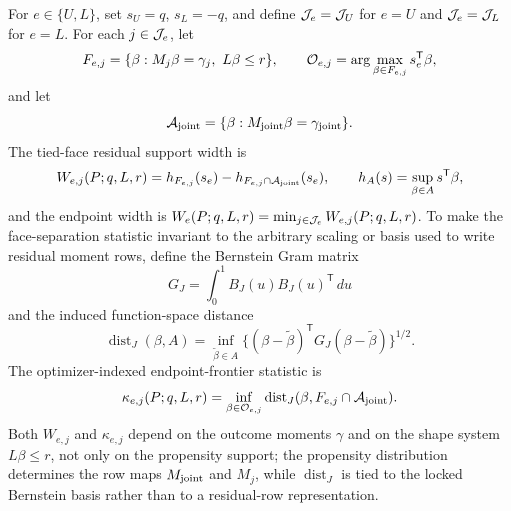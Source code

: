 \documentclass[11pt]{article}
\newcommand{\transpose}{\mathsf{T}}
\theoremstyle{definition}
\theoremstyle{plain}
\theoremstyle{remark}
\begin{document}
For \(e\in\{U,L\}\), set \(s_U=q\), \(s_L=-q\), and define
\({\cal J}_e={\cal J}_U\) for \(e=U\) and \({\cal J}_e={\cal J}_L\) for
\(e=L\).  For each \(j\in{\cal J}_e\), let
\[
F_{e,j}=\{\beta:M_j\beta=\gamma_j,\ L\beta\le r\},\qquad
{\cal O}_{e,j}=\arg\max_{\beta\in F_{e,j}}s_e^\transpose\beta ,
\]
and let
\[
{\cal A}_{\rm joint}=\{\beta:M_{\rm joint}\beta=\gamma_{\rm joint}\}.
\]
The tied-face residual support width is
\[
W_{e,j}(P;q,L,r)=
h_{F_{e,j}}(s_e)-h_{F_{e,j}\cap{\cal A}_{\rm joint}}(s_e),
\qquad
h_A(s)=\sup_{\beta\in A}s^\transpose\beta ,
\]
and the endpoint width is \(W_e(P;q,L,r)=\min_{j\in{\cal J}_e}W_{e,j}(P;q,L,r)\).
To make the face-separation statistic invariant to the arbitrary scaling or
basis used to write residual moment rows, define the Bernstein Gram matrix
\[
G_J=\int_0^1B_J(u)B_J(u)^\transpose\,du
\]
and the induced function-space distance
\[
\operatorname{dist}_J(\beta,A)=
\inf_{\tilde\beta\in A}\{(\beta-\tilde\beta)^\transpose
G_J(\beta-\tilde\beta)\}^{1/2}.
\]
The optimizer-indexed endpoint-frontier statistic is
\[
\kappa_{e,j}(P;q,L,r)=
\inf_{\beta\in{\cal O}_{e,j}}
\operatorname{dist}_J(\beta,F_{e,j}\cap{\cal A}_{\rm joint}).
\]
Both \(W_{e,j}\) and \(\kappa_{e,j}\) depend on the outcome moments
\(\gamma\) and on the shape system \(L\beta\le r\), not only on the
propensity support; the propensity distribution determines the row maps
\(M_{\rm joint}\) and \(M_j\), while \(\operatorname{dist}_J\) is tied to the
locked Bernstein basis rather than to a residual-row representation.
\end{document}
